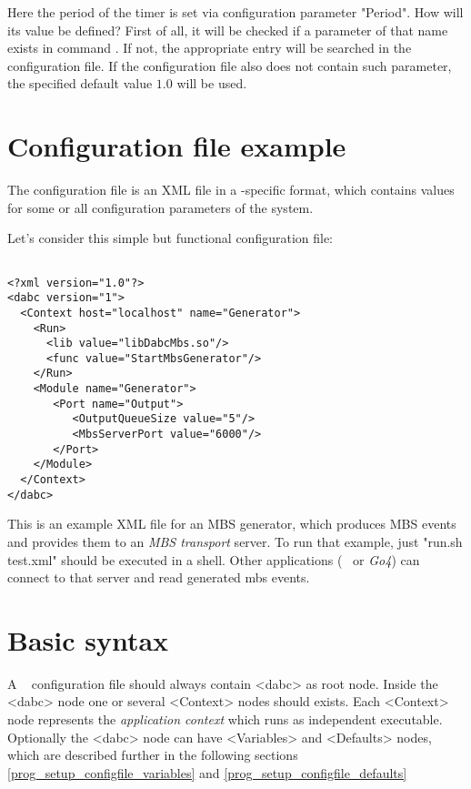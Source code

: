 Here the period of the timer is set via configuration parameter "Period". 
How will its value  be defined? 
First of all, it will be checked if a parameter of that name exists in command
. If not, the appropriate entry will be searched in the configuration file. 
If the configuration file also does not contain such parameter, 
the specified default value $1.0$  will be used.


\section{Configuration file example}
\label{prog_setup_configfile}
The configuration file is an XML file in a \dabc-specific format, 
which contains values for some or all configuration parameters of the system. 

Let's consider this simple but functional configuration file:

\begin{verbatim}

<?xml version="1.0"?>
<dabc version="1">
  <Context host="localhost" name="Generator">
    <Run>
      <lib value="libDabcMbs.so"/>
      <func value="StartMbsGenerator"/>
    </Run>
    <Module name="Generator">
       <Port name="Output">
          <OutputQueueSize value="5"/>
          <MbsServerPort value="6000"/>
       </Port>
    </Module>
  </Context>
</dabc>

\end{verbatim}

This is an example XML file for an MBS generator, which produces 
MBS events and provides them to an {\em MBS transport} server. 
To run that example, just "run.sh test.xml" should be executed in a shell.
Other applications
(\dabc~ or {\em Go4}) can connect to that server and read generated mbs events.


\section{Basic syntax}
\label{prog_setup_configfile_syntax}
A \dabc~ configuration file should always contain <dabc> as root node. 
Inside the <dabc> node one or several <Context> nodes should exists.
Each <Context> node represents the {\em application context} which runs as
independent executable. 
Optionally the <dabc> node can have <Variables> and <Defaults> nodes, 
which are described further in the following sections  \ref{prog_setup_configfile_variables}
and \ref{prog_setup_configfile_defaults}


